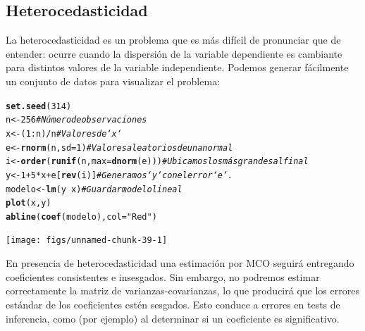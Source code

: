 \documentclass{article}\usepackage[]{graphicx}\usepackage[]{color}
\makeatletter
\newcommand{\hlnum}[1]{\textcolor[rgb]{0.686,0.059,0.569}{#1}}%
\newcommand{\hlstr}[1]{\textcolor[rgb]{0.192,0.494,0.8}{#1}}%
\newcommand{\hlcom}[1]{\textcolor[rgb]{0.678,0.584,0.686}{\textit{#1}}}%
\newcommand{\hlopt}[1]{\textcolor[rgb]{0,0,0}{#1}}%
\newcommand{\hlstd}[1]{\textcolor[rgb]{0.345,0.345,0.345}{#1}}%
\newcommand{\hlkwb}[1]{\textcolor[rgb]{0.69,0.353,0.396}{#1}}%
\newcommand{\hlkwc}[1]{\textcolor[rgb]{0.333,0.667,0.333}{#1}}%
\newcommand{\hlkwd}[1]{\textcolor[rgb]{0.737,0.353,0.396}{\textbf{#1}}}%
\newenvironment{kframe}{%
 \def\at@end@of@kframe{}%
 \ifinner\ifhmode%
  \def\at@end@of@kframe{\end{minipage}}%
  \begin{minipage}{\columnwidth}%
 \fi\fi%
 \def\FrameCommand##1{\hskip\@totalleftmargin \hskip-\fboxsep
 \colorbox{shadecolor}{##1}\hskip-\fboxsep
     \hskip-\linewidth \hskip-\@totalleftmargin \hskip\columnwidth}%
 \MakeFramed {\advance\hsize-\width
   \@totalleftmargin\z@ \linewidth\hsize
   \@setminipage}}%
 {\par\unskip\endMakeFramed%
 \at@end@of@kframe}
\newenvironment{knitrout}{}{} %
\makeatother
\begin{document}
\subsection{Heterocedasticidad}

La heterocedasticidad es un problema que es más difícil de pronunciar que de entender: ocurre cuando la dispersión de la variable dependiente es cambiante para distintos valores de la variable independiente. Podemos generar fácilmente un conjunto de datos para visualizar el problema:

\begin{knitrout}
\color{fgcolor}\begin{kframe}
\begin{alltt}
\hlkwd{set.seed}\hlstd{(}\hlnum{314}\hlstd{)}
\hlstd{n} \hlkwb{<-} \hlnum{256}                           \hlcom{# Número de observaciones}
\hlstd{x} \hlkwb{<-} \hlstd{(}\hlnum{1}\hlopt{:}\hlstd{n)}\hlopt{/}\hlstd{n}                       \hlcom{# Valores de `x`}
\hlstd{e} \hlkwb{<-} \hlkwd{rnorm}\hlstd{(n,} \hlkwc{sd}\hlstd{=}\hlnum{1}\hlstd{)}                \hlcom{# Valores aleatorios de una normal}
\hlstd{i} \hlkwb{<-} \hlkwd{order}\hlstd{(}\hlkwd{runif}\hlstd{(n,} \hlkwc{max}\hlstd{=}\hlkwd{dnorm}\hlstd{(e)))} \hlcom{# Ubicamos los más grandes al final}
\hlstd{y} \hlkwb{<-} \hlnum{1} \hlopt{+} \hlnum{5} \hlopt{*} \hlstd{x} \hlopt{+} \hlstd{e[}\hlkwd{rev}\hlstd{(i)]}         \hlcom{# Generamos `y` con el error `e`.}
\hlstd{modelo} \hlkwb{<-} \hlkwd{lm}\hlstd{(y} \hlopt{~} \hlstd{x)}                \hlcom{# Guardar modelo lineal}
\hlkwd{plot}\hlstd{(x, y)}
\hlkwd{abline}\hlstd{(}\hlkwd{coef}\hlstd{(modelo),} \hlkwc{col} \hlstd{=} \hlstr{"Red"}\hlstd{)}
\end{alltt}
\end{kframe}

{\centering \texttt{[image: figs/unnamed-chunk-39-1]} 

}



\end{knitrout}

En presencia de heterocedasticidad una estimación por MCO seguirá entregando coeficientes consistentes e insesgados. Sin embargo, no podremos estimar correctamente la matriz de varianzas-covarianzas, lo que producirá que los errores estándar de los coeficientes estén sesgados. Esto conduce a errores en tests de inferencia, como (por ejemplo) al determinar si un coeficiente es significativo.
\end{document}
